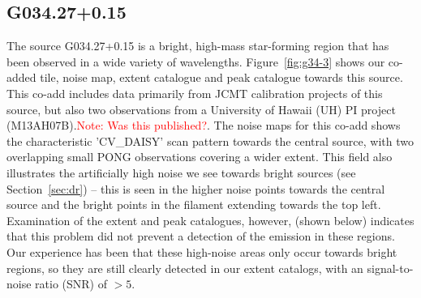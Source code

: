 \documentclass[twocolumn,times]{aastex6}
\newcommand{\note}[1]{\textcolor{red}{Note: #1}}
\begin{document}
\subsection{G034.27+0.15}
The source G034.27+0.15 is a bright, high-mass star-forming region
that has been observed in a wide variety of
wavelengths. Figure~\ref{fig:g34-3} shows our co-added tile, noise map,
extent catalogue and peak catalogue towards this source. This co-add
includes data primarily from JCMT calibration projects of this source,
but also two observations from a University of Hawaii (UH) PI project
(M13AH07B).\note{Was this published?}. The noise maps for this co-add
shows the characteristic 'CV\_DAISY' scan pattern towards the central
source, with two overlapping small PONG observations covering a wider
extent. This field also illustrates the artificially high noise we
see towards bright sources (see Section~\ref{sec:dr}) -- this is seen
in the higher noise points towards the central source and the bright
points in the filament extending towards the top left. Examination of
the extent and peak catalogues, however, (shown below) indicates that
this problem did not prevent a detection of the emission in these
regions. Our experience has been that these high-noise areas only
occur towards bright regions, so they are still clearly detected in
our extent catalogs, with an signal-to-noise ratio (SNR) of $>5$.



\end{document}
